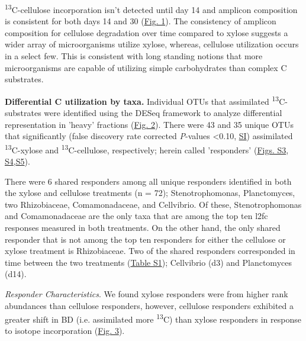 \textsuperscript{13}C-cellulose incorporation isn't detected until day 14 and
amplicon composition is consistent for both days 14 and 30
(\href{https://www.authorea.com/users/3537/articles/3612/master/file/figures/ordination_all1/ordination_all1.png}{Fig.
1}). The consistency of amplicon composition for cellulose degradation over
time compared to xylose suggests a wider array of microorganisms utilize
xylose, whereas, cellulose utilization occurs in a select few. This is
consistent with long standing notions that more microorganisms are capable of
utilizing simple carbohydrates than complex C substrates. 



\textbf{Differential C utilization by taxa.} Individual OTUs that assimilated
\textsuperscript{13}C-substrates were identified using the DESeq framework
\cite{Anders_Huber_2010} to analyze differential representation in 'heavy'
fractions
(\href{https://www.authorea.com/users/3537/articles/3612/master/file/figures/l2fc_fig1/l2fc_fig.pdf}{Fig.
2}). There were 43 and 35 unique OTUs that significantly (false discovery rate
corrected \textit{P}-values \textless 0.10,
\href{https://authorea.com/users/3537/articles/8459/_show_article}{SI})
assimilated \textsuperscript{13}C-xylose and \textsuperscript{13}C-cellulose,
respectively; herein called 'responders'
(\href{https://www.authorea.com/users/3537/articles/8459/master/file/figures/OTU_screening_schematic/OTU_screening_schematic.pdf}{Figs.
S3},
\href{https://www.authorea.com/users/3537/articles/8459/master/file/figures/l2fc_fig_pVal/l2fc_fig_pVal.png}{S4},\href{https://authorea.com/users/3537/articles/8459/master/file/figures/manhattan/manhattan.png}{S5}).






There were 6 shared responders among all unique responders identified in both
the xylose and cellulose treatments (n = 72); Stenotrophomonas, Planctomyces,
two Rhizobiaceae, Comamonadaceae, and Cellvibrio. Of these, Stenotrophomonas
and Comamonadaceae are the only taxa that are among the top ten l2fc responses
measured in both treatments. On the other hand, the only shared responder that
is not among the top ten responders for either the cellulose or xylose
treatment is Rhizobiaceae. Two of the shared responders corresponded in time
between the two treatments
(\href{https://authorea.com/users/3537/articles/8459/master/file/figures/resp_table/resp_table.png}{Table
S1}); Cellvibrio (d3) and Planctomyces (d14).  

\textit{Responder Characteristics}.  We found xylose responders were from
higher rank abundances than cellulose responders, however, cellulose responders
exhibited a greater shift in BD (i.e. assimilated more \textsuperscript{13}C)
than xylose responders in response to isotope incorporation
(\href{https://authorea.com/users/3537/articles/3612/master/file/figures/shift_and_rabund2/shift_and_rabund2.png}{Fig.
3}). 

